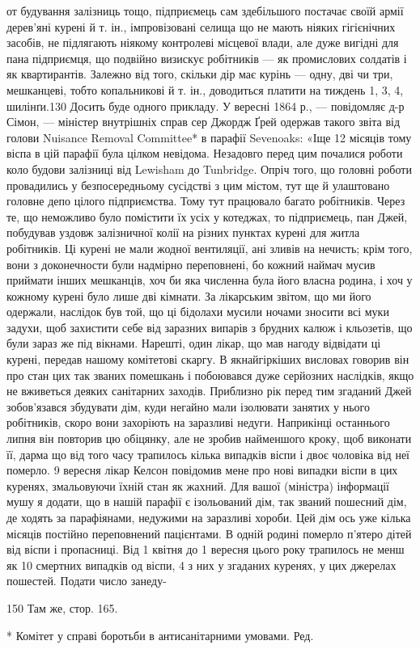 от будування залізниць тощо, підприємець сам здебільшого постачає
своїй армії дерев’яні курені й т. ін., імпровізовані селища
що не мають ніяких гігієнічних засобів, не підлягають ніякому
контролеві місцевої влади, але дуже вигідні для пана підприємця,
що подвійно визискує робітників — як промислових солдатів
і як квартирантів. Залежно від того, скільки дір має курінь —
одну, дві чи три, мешканцеві, тобто копальникові й т. ін., доводиться
платити на тиждень 1, 3, 4, шилінґи.130 Досить буде одного
прикладу. У вересні 1864 р., — повідомляє д-р Сімон, — міністер
внутрішніх справ сер Джордж Ґрей одержав такого звіта
від голови Nuisance Removal Committee* в парафії Sevenoaks:
«Іще 12 місяців тому віспа в цій парафії була цілком невідома.
Незадовго перед цим почалися роботи коло будови залізниці
від Lewisham до Tunbridge. Опріч того, що головні роботи провадились
у безпосередньому сусідстві з цим містом, тут ще й
улаштовано головне депо цілого підприємства. Тому тут працювало
багато робітників. Через те, що неможливо було помістити
їх усіх у котеджах, то підприємець, пан Джей, побудував уздовж
залізничної колії на різних пунктах курені для житла робітників.
Ці курені не мали жодної вентиляції, ані зливів на нечисть;
крім того, вони з доконечности були надмірно переповнені,
бо кожний наймач мусив приймати інших мешканців, хоч би
яка численна була його власна родина, і хоч у кожному курені
було лише дві кімнати. За лікарським звітом, що ми його одержали,
наслідок був той, що ці бідолахи мусили ночами зносити
всі муки задухи, щоб захистити себе від заразних випарів з брудних
калюж і кльозетів, що були зараз же під вікнами. Нарешті,
один лікар, що мав нагоду відвідати ці курені, передав нашому
комітетові скаргу. В якнайгіркіших висловах говорив він про
стан цих так званих помешкань і побоювався дуже серйозних
наслідків, якщо не вживеться деяких санітарних заходів. Приблизно
рік перед тим згаданий Джей зобов’язався збудувати дім,
куди негайно мали ізолювати занятих у нього робітників, скоро
вони захоріють на заразливі недуги. Наприкінці останнього
липня він повторив цю обіцянку, але не зробив найменшого
кроку, щоб виконати її, дарма що від того часу трапилось кілька
випадків віспи і двоє чоловіка від неї померло. 9 вересня лікар
Келсон повідомив мене про нові випадки віспи в цих куренях,
змальовуючи їхній стан як жахний. Для вашої (міністра) інформації
мушу я додати, що в нашій парафії є ізольований дім, так
званий пошесний дім, де ходять за парафіянами, недужими на
заразливі хороби. Цей дім ось уже кілька місяців постійно переповнений
пацієнтами. В одній родині померло п’ятеро дітей від
віспи і пропасниці. Від 1 квітня до 1 вересня цього року трапилось
не менш як 10 смертних випадків од віспи, 4 з них у згаданих
куренях, у цих джерелах пошестей. Подати число занеду-

150 Там же, стор. 165.

* Комітет у справі боротьби в антисанітарними умовами. Ред.
